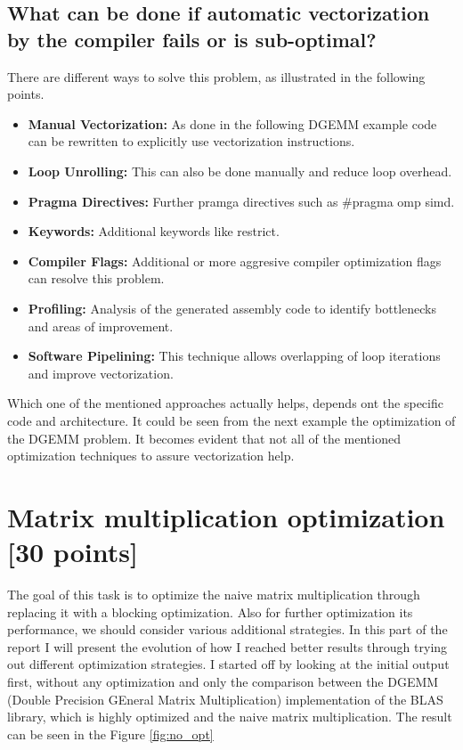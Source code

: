 \documentclass[unicode,11pt,a4paper,oneside,numbers=endperiod,openany]{scrartcl}
\begin{document}
\subsection{What can be done if automatic vectorization by the compiler fails or is sub-optimal?}
There are different ways to solve this problem, as illustrated in the following points.
\begin{itemize}
    \item {\textbf{Manual Vectorization:} As done in the following DGEMM example code can be rewritten to explicitly use vectorization instructions.}
    \item {\textbf{Loop Unrolling:} This can also be done manually and reduce loop overhead.}
    \item {\textbf{Pragma Directives:} Further pramga directives such as \#pragma omp simd.}
    \item {\textbf{Keywords:} Additional keywords like restrict.}
    \item {\textbf{Compiler Flags:} Additional or more aggresive compiler optimization flags can resolve this problem.}
    \item {\textbf{Profiling:} Analysis of the generated assembly code to identify bottlenecks and areas of improvement.}
    \item {\textbf{Software Pipelining:} This technique allows overlapping of loop iterations and improve vectorization.}
\end{itemize}
Which one of the mentioned approaches actually helps, depends ont the specific code and architecture. It could be seen from the next example the optimization of the DGEMM problem. 
It becomes evident that not all of the mentioned optimization techniques to assure vectorization help.

\section{Matrix multiplication optimization [30 points]}
The goal of this task is to optimize the naive matrix multiplication through replacing it with a 
blocking optimization. Also for further optimization its performance, we should consider various
additional strategies. In this part of the report I will present the evolution of how I reached 
better results through trying out different optimization strategies.
\newline
I started off by looking at the initial output first, without any optimization and only the comparison between 
the DGEMM (Double Precision GEneral Matrix Multiplication) implementation of the BLAS library, which is highly 
optimized and the naive matrix multiplication. The result can be seen in the Figure \ref{fig:no_opt}
\end{document}
